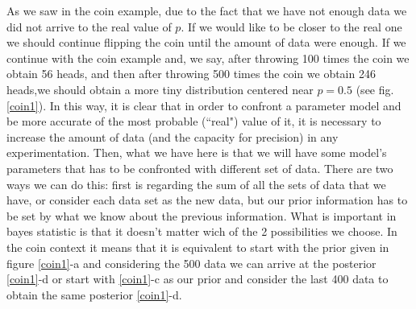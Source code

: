 \documentclass[onecolumn,           %
               showpacs,            %
               preprintnumbers,     %
               aps,                 %
               prl,          	    %
               letterpaper,             %
               superscriptaddress,      %
               nofootinbib,         %
               tightenlines,        %
               floats,floatfix      %
               ,usenatbib,
               ]{revtex4-1}
\begin{document}
As we saw in the coin example, due to the fact that we have not enough data we did not arrive to the real value of $p$. If we would like to be closer to the real one we should continue flipping the coin until the amount of data were enough. If we continue with the coin example and, we say, after throwing 100 times the coin we obtain 56 heads, and then after throwing 500 times the coin we obtain 246 heads,we should obtain a more tiny distribution centered near $p=0.5$ (see fig. \ref{coin1}). In this way, it is clear that in order to confront a parameter model and be more accurate of the most probable (``real") value of it, it is necessary to increase the amount of data (and the capacity for precision) in any experimentation. 
Then, what we have here is that we will have some model's parameters that has to be confronted with different set of data. There are two ways we can do this: first is regarding the sum of all the sets of data that we have, or consider each data set as the new data, but our prior information has to be set by what we know about the previous information. What is important in bayes statistic is that it doesn't matter wich of the 2 possibilities we choose. In the coin context it means that it is equivalent to start with the prior given in figure \ref{coin1}-a and considering the 500 data we can arrive at the posterior \ref{coin1}-d or start with \ref{coin1}-c as our prior and consider the last 400 data to obtain the same posterior \ref{coin1}-d. \\ $ $ \\
\end{document}
